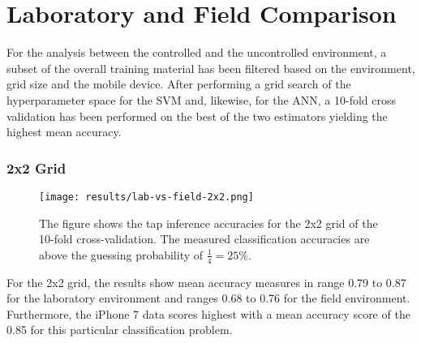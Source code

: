 
\section{Laboratory and Field Comparison}
For the analysis between the controlled and the uncontrolled environment, a subset of the overall training material has been filtered based on the environment, grid size and the mobile device. After performing a grid search of the hyperparameter space for the SVM and, likewise, for the ANN, a 10-fold cross validation has been performed on the best of the two estimators yielding the highest mean accuracy.

\subsubsection{2x2 Grid}

\begin{figure}[h!]
  \centering
  \texttt{[image: results/lab-vs-field-2x2.png]}
  \caption{The figure shows the tap inference accuracies for the 2x2 grid of the 10-fold cross-validation. The measured classification accuracies are above the guessing probability of $\frac{1}{4} = 25\%$.} \label{fig:lab2x2}
\end{figure}

For the 2x2 grid, the results show mean accuracy measures in range 0.79 to 0.87 for the laboratory environment and ranges 0.68 to 0.76 for the field environment. Furthermore, the iPhone 7 data scores highest with a mean accuracy score of the 0.85 for this particular classification problem.

